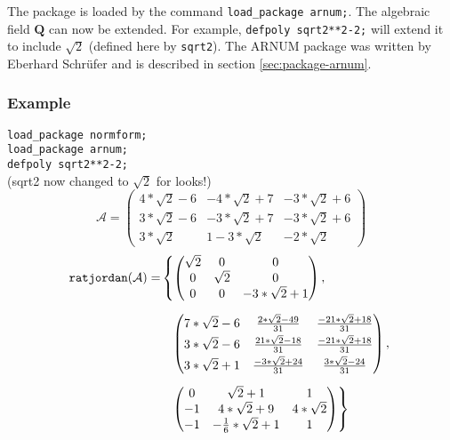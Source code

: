 The package is loaded by the command \texttt{load\_package arnum;}. The algebraic
field $\mathbf{Q}$ can now be extended. For example,
\texttt{defpoly sqrt2**2-2;} will extend it to include ${\sqrt{2}}$ (defined here by
\texttt{sqrt2}). The {\small ARNUM} package was written by Eberhard
Schr\"ufer and is described in section \ref{sec:package-arnum}.

\subsubsection{Example}

\texttt{load\_package normform;} \\
\texttt{load\_package arnum;} \\
\texttt{defpoly sqrt2**2-2;} \\
(sqrt2 now changed to ${\sqrt{2}}$ for looks!)
\[
\mathcal{A} = \begin{pmatrix} 4*{\sqrt{2}}-6 & -4*{\sqrt{2}}+7 &
-3*{\sqrt{2}}+6 \\ 3*{\sqrt{2}}-6 & -3*{\sqrt{2}}+7 & -3*{\sqrt{2}}+6
\\ 3*{\sqrt{2}} & 1-3*{\sqrt{2}} & -2*{\sqrt{2}} \end{pmatrix}
\]
\[
\begin{split}
\texttt{ratjordan}(\mathcal{A})  = &
\left\{ \begin{pmatrix} {\sqrt{2}} & 0 & 0 \\ 0 & {\sqrt{2}}
& 0 \\ 0 & 0 & -3*{\sqrt{2}}+1 \end{pmatrix}, \right. \\[2mm]
 & \hspace{0.1in} \left. \begin{pmatrix}
 7*{\sqrt{2}}-6 & \frac{2*{\sqrt{2}}-49}{31} & \frac{-21*{\sqrt{2}}+18}{31} \\[1mm]
 3*{\sqrt{2}}-6 & \frac{21*{\sqrt{2}}-18}{31} & \frac{-21*{\sqrt{2}}+18}{31} \\[1mm]
 3*{\sqrt{2}}+1 & \frac{-3*{\sqrt{2}}+24}{31} & \frac{3*{\sqrt{2}}-24}{31}
 \end{pmatrix}, \right. \\[2mm]
& \hspace{0.1in} \left. \begin{pmatrix} 0 & {\sqrt{2}}+1 &
1 \\ -1 & 4*{\sqrt{2}}+9 & 4*{\sqrt{2}} \\ -1 & -\frac{1}{6}*{\sqrt{2}}
+1 & 1 \end{pmatrix} \right\}
\end{split}
\]

